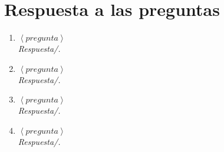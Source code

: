 
\section{Respuesta a las preguntas}

\begin{enumerate}
\item $\left< \textit{pregunta}\right>$  \\

\textit{Respuesta/.}

\item $\left< \textit{pregunta}\right>$\\

\textit{Respuesta/.}

\item $\left< \textit{pregunta}\right>$\\

\textit{Respuesta/.}

\item $\left< \textit{pregunta}\right>$\\

\textit{Respuesta/.}

\end{enumerate}